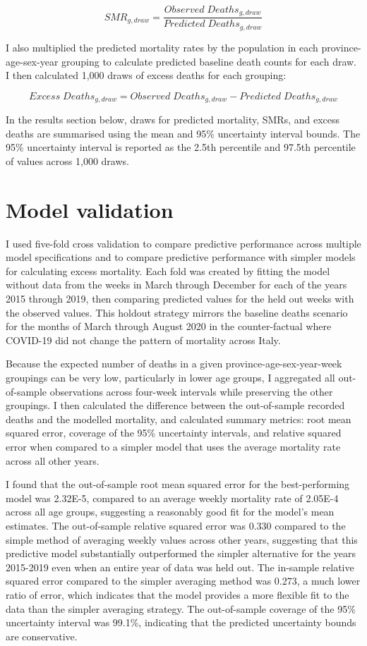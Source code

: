 \documentclass[
]{report}
\begin{document}
\[SMR_{g,draw} = \frac{Observed\;Deaths_{g,draw}}{Predicted\;Deaths_{g,draw}}\]

I also multiplied the predicted mortality rates by the population in each province-age-sex-year grouping to calculate predicted baseline death counts for each draw. I then calculated 1,000 draws of excess deaths for each grouping:

\[Excess\;Deaths_{g,draw}=Observed\;Deaths_{g,draw}-Predicted\;Deaths_{g,draw}\]

In the results section below, draws for predicted mortality, SMRs, and excess deaths are summarised using the mean and 95\% uncertainty interval bounds. The 95\% uncertainty interval is reported as the 2.5th percentile and 97.5th percentile of values across 1,000 draws.

\hypertarget{model-validation}{%
\section{Model validation}\label{model-validation}}

I used five-fold cross validation to compare predictive performance across multiple model specifications and to compare predictive performance with simpler models for calculating excess mortality. Each fold was created by fitting the model without data from the weeks in March through December for each of the years 2015 through 2019, then comparing predicted values for the held out weeks with the observed values. This holdout strategy mirrors the baseline deaths scenario for the months of March through August 2020 in the counter-factual where COVID-19 did not change the pattern of mortality across Italy.

Because the expected number of deaths in a given province-age-sex-year-week groupings can be very low, particularly in lower age groups, I aggregated all out-of-sample observations across four-week intervals while preserving the other groupings. I then calculated the difference between the out-of-sample recorded deaths and the modelled mortality, and calculated summary metrics: root mean squared error, coverage of the 95\% uncertainty intervals, and relative squared error when compared to a simpler model that uses the average mortality rate across all other years.

I found that the out-of-sample root mean squared error for the best-performing model was 2.32E-5, compared to an average weekly mortality rate of 2.05E-4 across all age groups, suggesting a reasonably good fit for the model's mean estimates. The out-of-sample relative squared error was 0.330 compared to the simple method of averaging weekly values across other years, suggesting that this predictive model substantially outperformed the simpler alternative for the years 2015-2019 even when an entire year of data was held out. The in-sample relative squared error compared to the simpler averaging method was 0.273, a much lower ratio of error, which indicates that the model provides a more flexible fit to the data than the simpler averaging strategy. The out-of-sample coverage of the 95\% uncertainty interval was 99.1\%, indicating that the predicted uncertainty bounds are conservative.
\end{document}
